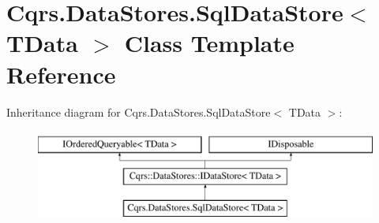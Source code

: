\hypertarget{classCqrs_1_1DataStores_1_1SqlDataStore}{}\section{Cqrs.\+Data\+Stores.\+Sql\+Data\+Store$<$ T\+Data $>$ Class Template Reference}
\label{classCqrs_1_1DataStores_1_1SqlDataStore}
Inheritance diagram for Cqrs.\+Data\+Stores.\+Sql\+Data\+Store$<$ T\+Data $>$\+:\begin{figure}[H]
\begin{center}
\leavevmode
\includegraphics[height=3.000000cm]{classCqrs_1_1DataStores_1_1SqlDataStore}
\end{center}
\end{figure}
